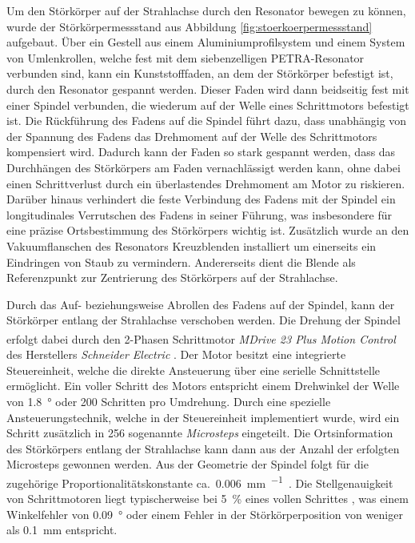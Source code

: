 Um den Störkörper auf der Strahlachse durch den Resonator bewegen zu können, wurde der Störkörpermessstand aus Abbildung \ref{fig:stoerkoerpermessstand} aufgebaut.
Über ein Gestell aus einem Aluminiumprofilsystem und einem System von Umlenkrollen, welche fest mit dem siebenzelligen PETRA-Resonator verbunden sind, kann ein Kunststofffaden, an dem der Störkörper befestigt ist, durch den Resonator gespannt werden.
Dieser Faden wird dann beidseitig fest mit einer Spindel verbunden, die wiederum auf der Welle eines Schrittmotors befestigt ist.
Die Rückführung des Fadens auf die Spindel führt dazu, dass unabhängig von der Spannung des Fadens das Drehmoment auf der Welle des Schrittmotors kompensiert wird.
Dadurch kann der Faden so stark gespannt werden, dass das Durchhängen des Störkörpers am Faden vernachlässigt werden kann, ohne dabei einen Schrittverlust durch ein überlastendes Drehmoment am Motor zu riskieren.
Darüber hinaus verhindert die feste Verbindung des Fadens mit der Spindel ein longitudinales Verrutschen des Fadens in seiner Führung, was insbesondere für eine präzise Ortsbestimmung des Störkörpers wichtig ist.
Zusätzlich wurde an den Vakuumflanschen des Resonators Kreuzblenden installiert um einerseits ein Eindringen von Staub zu vermindern. Andererseits dient die Blende als Referenzpunkt zur Zentrierung des Störkörpers auf der Strahlachse.

Durch das Auf- beziehungsweise Abrollen des Fadens auf der Spindel, kann der Störkörper entlang der Strahlachse verschoben werden.
Die Drehung der Spindel erfolgt dabei durch den 2-Phasen Schrittmotor \textit{MDrive\textsuperscript{\textregistered} 23 Plus Motion Control} des Herstellers \textit{Schneider Electric} \cite{motor_datasheet}.
Der Motor besitzt eine integrierte Steuereinheit, welche die direkte Ansteuerung über eine serielle Schnittstelle ermöglicht.
Ein voller Schritt des Motors entspricht einem Drehwinkel der Welle von \SI{1.8}{\degree} oder \num{200} Schritten pro Umdrehung.
Durch eine spezielle Ansteuerungstechnik, welche in der Steuereinheit implementiert wurde, wird ein Schritt zusätzlich in \num{256} sogenannte \textit{Microsteps} eingeteilt.
Die Ortsinformation des Störkörpers entlang der Strahlachse kann dann aus der Anzahl der erfolgten Microsteps gewonnen werden.
Aus der Geometrie der Spindel folgt für die zugehörige Proportionalitätskonstante ca.\ \SI{0.006}{\milli\metre\per\micro\step}.
Die Stellgenauigkeit von Schrittmotoren liegt typischerweise bei \SI{5}{\percent} eines vollen Schrittes \cite{gecko}, was einem Winkelfehler von \SI{0.09}{\degree} oder einem Fehler in der Störkörperposition von weniger als \SI{0.1}{\milli\metre} entspricht.

